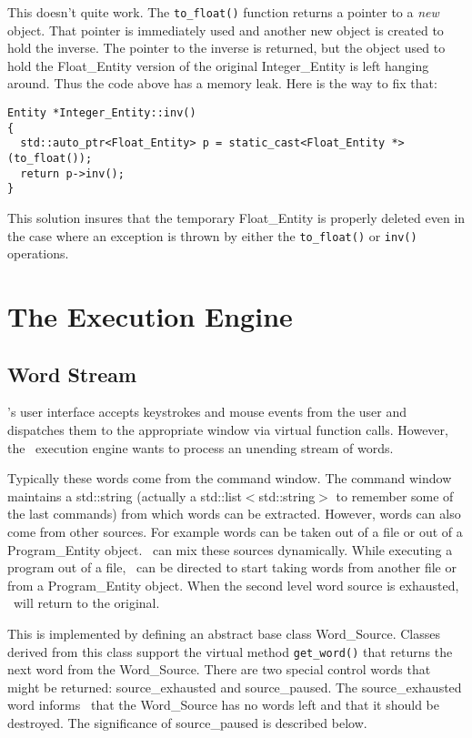 \documentclass{report}
\begin{document}
This doesn't quite work. The \texttt{to\_float()} function returns a pointer to a \emph{new}
object. That pointer is immediately used and another new object is created to hold the inverse.
The pointer to the inverse is returned, but the object used to hold the Float\_Entity version of
the original Integer\_Entity is left hanging around. Thus the code above has a memory leak. Here
is the way to fix that:

\begin{verbatim}
Entity *Integer_Entity::inv()
{
  std::auto_ptr<Float_Entity> p = static_cast<Float_Entity *>(to_float());
  return p->inv();
}
\end{verbatim}

This solution insures that the temporary Float\_Entity is properly deleted even in the case
where an exception is thrown by either the \texttt{to\_float()} or \texttt{inv()} operations.


\chapter{The Execution Engine}

\section{Word Stream}

\CLAC's user interface accepts keystrokes and mouse events from the user and dispatches them to
the appropriate window via virtual function calls. However, the \CLAC\ execution engine wants to
process an unending stream of words.

Typically these words come from the command window. The command window maintains a std::string
(actually a std::list$<$std::string$>$ to remember some of the last commands) from which words
can be extracted. However, words can also come from other sources. For example words can be
taken out of a file or out of a Program\_Entity object. \CLAC\ can mix these sources
dynamically. While executing a program out of a file, \CLAC\ can be directed to start taking
words from another file or from a Program\_Entity object. When the second level word source is
exhausted, \CLAC\ will return to the original.

This is implemented by defining an abstract base class Word\_Source. Classes derived from this
class support the virtual method \texttt{get\_word()} that returns the next word from the
Word\_Source. There are two special control words that might be returned: source\_exhausted and
source\_paused. The source\_exhausted word informs \CLAC\ that the Word\_Source has no words
left and that it should be destroyed. The significance of source\_paused is described below.
\end{document}
